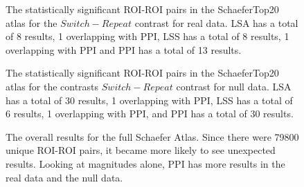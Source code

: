 \documentclass[phd,figures,tables,ackpage,abstractpage,publicabstractpage]{uithesis}
\begin{document}
\begin{figure}[H]
  \ContinuedFloat
  \centering


  \caption[All contrasts for all atlases for all data for LSA/LSS versus PPI continued...]{
      The statistically significant ROI-ROI pairs in the SchaeferTop20 atlas
      for the $Switch - Repeat$ contrast for real data.
      LSA has a total of 8 results, 1 overlapping with PPI,
      LSS has a total of 8 results, 1 overlapping with PPI and
      PPI has a total of 13 results.
  }
  \label{fig:data-real_type-brain_atlas-schaeferbest_contrast-switchxrepeat}
\end{figure}

\begin{figure}[H]
  \ContinuedFloat
  \centering


  \caption[All contrasts for all atlases for all data for LSA/LSS versus PPI continued...]{
      The statistically significant ROI-ROI pairs in the SchaeferTop20 atlas
      for the contrasts $Switch - Repeat$ contrast for null data.
      LSA has a total of 30 results, 1 overlapping with PPI,
      LSS has a total of 6 results, 1 overlapping with PPI,
      and PPI has a total of 30 results.
  }
  \label{fig:data-null_type-brain_atlas-schaeferbest_contrast-switchxrepeat}
\end{figure}

\begin{figure}[H]
  \centering


  \caption[Comparison of LSA/LSS/PPI using participant data and the Schaefer atlas]{
      The overall results for the full Schaefer Atlas.
      Since there were 79800 unique ROI-ROI pairs, it became more likely
      to see unexpected results.
      Looking at magnitudes alone, PPI has more results in the real data
      and the null data.
  }
  \label{fig:schaefer_binomial_ppi}
\end{figure}
\end{document}
